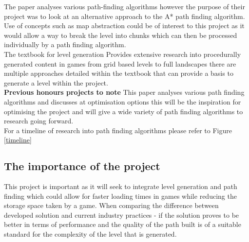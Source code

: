 The paper\cite{paths1} analyses various path-finding algorithms however the purpose of their project was to look at an alternative approach to the A* path finding algorithm.  Use of concepts such as map abstraction could be of interest to this project as it would allow a way to break the level into chunks which can then be processed individually by a path finding algorithm.\\

The textbook for level generation \cite{levels2} Provides extensive research into procedurally generated content in games from grid based levels to full landscapes there are multiple approaches detailed within the textbook that can provide a basis to generate a level within the project.\\

\textbf{Previous honours projects to note}\newline
This paper\cite{honours} analyses various path finding algorithms and discusses at optimisation options this will be the inspiration for optimising the project and will give a wide variety of path finding algorithms to research going forward.\\

For a timeline of research into path finding algorithms please refer to Figure \ref{timeline}

\subsection{The importance of the project}
This project is important as it will seek to integrate level generation and path finding which could allow for faster loading times in games while reducing the storage space taken by a game. When comparing the difference between developed solution and current industry practices - if the solution proves to be better in terms of performance and the quality of the path built is of a suitable standard for the complexity of the level that is generated.   

